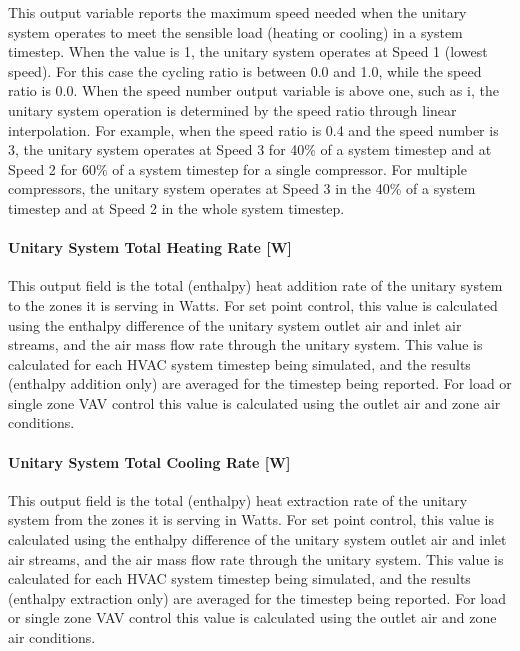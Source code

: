 This output variable reports the maximum speed needed when the unitary system operates to meet the sensible load (heating or cooling) in a system timestep. When the value is 1, the unitary system operates at Speed 1 (lowest speed). For this case the cycling ratio is between 0.0 and 1.0, while the speed ratio is 0.0. When the speed number output variable is above one, such as i, the unitary system operation is determined by the speed ratio through linear interpolation. For example, when the speed ratio is 0.4 and the speed number is 3, the unitary system operates at Speed 3 for 40\% of a system timestep and at Speed 2 for 60\% of a system timestep for a single compressor. For multiple compressors, the unitary system operates at Speed 3 in the 40\% of a system timestep and at Speed 2 in the whole system timestep.

\paragraph{Unitary System Total Heating Rate {[}W{]}}\label{unitary-system-total-heating-rate-w}

This output field is the total (enthalpy) heat addition rate of the unitary system to the zones it is serving in Watts. For set point control, this value is calculated using the enthalpy difference of the unitary system outlet air and inlet air streams, and the air mass flow rate through the unitary system. This value is calculated for each HVAC system timestep being simulated, and the results (enthalpy addition only) are averaged for the timestep being reported. For load or single zone VAV control this value is calculated using the outlet air and zone air conditions.

\paragraph{Unitary System Total Cooling Rate {[}W{]}}\label{unitary-system-total-cooling-rate-w}

This output field is the total (enthalpy) heat extraction rate of the unitary system from the zones it is serving in Watts. For set point control, this value is calculated using the enthalpy difference of the unitary system outlet air and inlet air streams, and the air mass flow rate through the unitary system. This value is calculated for each HVAC system timestep being simulated, and the results (enthalpy extraction only) are averaged for the timestep being reported. For load or single zone VAV control this value is calculated using the outlet air and zone air conditions.

